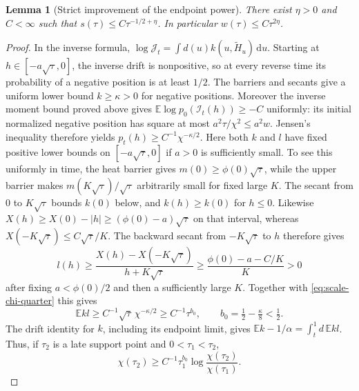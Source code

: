 \documentclass[11pt,a4paper]{article}
\numberwithin{equation}{section}
\newtheorem{lemma}[theorem]{Lemma}
\theoremstyle{definition}
\theoremstyle{remark}
\newcommand{\E}{\mathbb E}
\newcommand{\dd}{\mathrm d}
\begin{document}
\begin{lemma}[Strict improvement of the endpoint power]\label{lem:scale-strict-power}
There exist $\eta>0$ and $C<\infty$ such that
$s(\tau)\le C\tau^{-1/2+\eta}$. In particular $w(\tau)\le C\tau^{2\eta}$.
\end{lemma}
\begin{proof}
In the inverse formula,
$\log \mathcal J_t=\int d(u)k(u,\widetilde H_u)\,\dd u$.
Starting at $h\in[-a\sqrt\tau,0]$, the inverse drift is nonpositive,
so at every reverse time its probability of a negative position is at
least $1/2$. The barriers and secants give a uniform lower bound
$k\ge\kappa>0$ for negative positions. Moreover the inverse moment
bound proved above gives $\E\log p_0(\mathcal I_t(h))\ge-C$ uniformly: its
initial normalized negative position has square at most
$a^2\tau/\chi^2\le a^2w$.
Jensen's inequality therefore yields
$p_t(h)\ge C^{-1}\chi^{-\kappa/2}$.
Here both $k$ and $l$ have fixed positive lower bounds on
$[-a\sqrt\tau,0]$ if $a>0$ is sufficiently small. To see this
uniformly in time, the heat barrier gives
$m(0)\ge\phi(0)\sqrt\tau$, while the upper barrier makes
$m(K\sqrt\tau)/\sqrt\tau$ arbitrarily small for fixed large $K$.
The secant from $0$ to $K\sqrt\tau$ bounds $k(0)$ below, and
$k(h)\ge k(0)$ for $h\le0$. Likewise
$X(h)\ge X(0)-|h|\ge(\phi(0)-a)\sqrt\tau$ on that interval,
whereas $X(-K\sqrt\tau)\le C\sqrt\tau/K$.
The backward secant from $-K\sqrt\tau$ to $h$ therefore gives
\[
 l(h)\ge\frac{X(h)-X(-K\sqrt\tau)}{h+K\sqrt\tau}
       \ge\frac{\phi(0)-a-C/K}{K}>0
\]
after fixing $a<\phi(0)/2$ and then a sufficiently large $K$.
Together with \eqref{eq:scale-chi-quarter} this gives
\[
 \E kl\ge C^{-1}\sqrt\tau\,\chi^{-\kappa/2}
 \ge C^{-1}\tau^{b_0},\qquad b_0=\tfrac12-\tfrac\kappa8<\tfrac12.
\]
The drift identity for $k$, including its endpoint limit, gives
$\E k-1/\alpha=\int_t^1d\,\E kl$.
Thus, if $\tau_2$ is a late support point and $0<\tau_1<\tau_2$,
\begin{equation}\label{eq:scale-power-growth}
 \chi(\tau_2)\ge C^{-1}\tau_1^{b_0}
 \log\frac{\chi(\tau_2)}{\chi(\tau_1)}.
\end{equation}


\end{proof}
\end{document}
